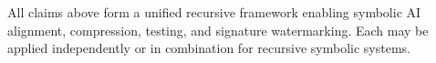 \begin{tcolorbox}[colback=black!5, colframe=OriaGold, title=\textbf{Patent Cascade Notice}, sharp corners=south]
All claims above form a unified recursive framework enabling symbolic AI alignment, compression, testing, and signature watermarking. Each may be applied independently or in combination for recursive symbolic systems.
\end{tcolorbox}

